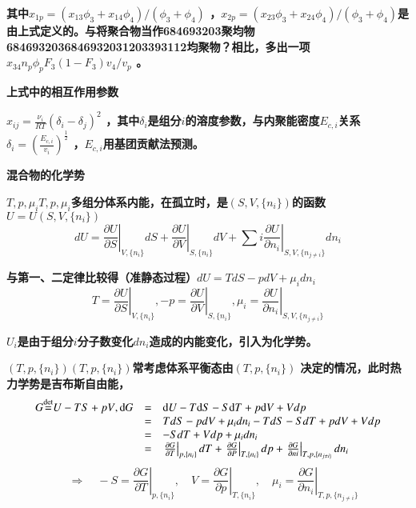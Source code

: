 \documentclass{article} %
\begin{document}
{\bf 其中$x_{1p} =(x_{13} \phi _{3} +x_{14} \phi _{4} )/(\phi _{3} +\phi _{4} )$ ，$x_{2p} =(x_{23} \phi _{3} +x_{24} \phi _{4} )/(\phi _{3} +\phi _{4} )$是由上式定义的。与将聚合物当作684693203聚均物6846932036846932031203393112均聚物？相比，多出一项$x_{34} n_{p} \phi _{p} F_{3} (1-F_{3} )v_{4} /v_{p} $ 。}

\noindent 
{\bf 上式中的相互作用参数}

\noindent 
{\bf $x_{ij} =\frac{\nu _{i} }{RT} \left(\delta _{i} -\delta _{j} \right)^{2} $ ，其中$\delta _{i} $是组分$i$的溶度参数，与内聚能密度$E_{c,i} $关系$\delta _{i} =(\frac{E_{c,i} }{v_{i} } )^{\frac{1}{2} } $ ，$E_{c,i} $用基团贡献法预测。}

\noindent \eject 

\noindent \textbf{混合物的化学势}


{\bf  $T,p,\mu _{i} $$T,p,\mu _{i} $多组分体系内能，在孤立时，是$(S,V,\{ n_{i} \} )$的函数$U=U(S,V,\{ n_{i} \} )$
\[dU=\left. \frac{\partial U}{\partial S} \right|_{V,\{ n_{i} \} } dS+\left. \frac{\partial U}{\partial V} \right|_{S,\{ n_{i} \} } dV+\sum i \left. \frac{\partial U}{\partial n_{i} } \right|_{S,V,\{ n_{j\ne i} \} } dn_{i} \] }

{\bf 与第一、二定律比较得（准静态过程）$dU=TdS-pdV+\mu _{i} dn_{i} $
\[T=\left. \frac{\partial U}{\partial S} \right|_{V,\{ n_{i} \} } ,-p=\left. \frac{\partial U}{\partial V} \right|_{S,\{ n_{i} \} } ,\mu _{i} =\left. \frac{\partial U}{\partial n_{i} } \right|_{S,V,\{ n_{j\ne i} \} } \] }

{\bf $U_{i} $是由于组分$i$分子数变化$dn_{i} $造成的内能变化，引入为化学势。}


{\bf  $(T,p,\{ n_{i} \} )$$(T,p,\{ n_{i} \} )$常考虑体系平衡态由$(T,p,\{ n_{i} \} )$ 决定的情况，此时热力学势是吉布斯自由能，
\[\begin{array}{rcl} {G{\mathop{=}\limits^{{\rm det}}} U-TS+pV{\rm ,d}G} & {=} & {{\rm d}U-T{\rm d}S-S{\rm d}T+p{\rm d}V+Vdp} \\ {} & {=} & {TdS-pdV+\mu _{i} dn_{i} -TdS-SdT+pdV+Vdp} \\ {} & {=} & {-SdT+Vdp+\mu _{i} dn_{i} } \\ {} & {=} & {\left. \frac{\partial G}{\partial T} \right|_{p,\{ n_{i} \} } dT+\left. \frac{\partial G}{\partial P} \right|_{T,\{ n_{i} \} } dp+\left. \frac{\partial G}{\partial ni} \right|_{T,p,\{ n_{j\ne i\} } } dn_{i} } \end{array}\] 
\[\quad \Rightarrow \quad -S=\left. \frac{\partial G}{\partial T} \right|_{p,\{ n_{i} \} } ,\quad V=\left. \frac{\partial G}{\partial p} \right|_{T,\{ n_{i} \} } ,\quad \mu _{i} =\left. \frac{\partial G}{\partial n_{i} } \right|_{T,p,\{ n_{j\ne i} \} } \] }
\end{document}
